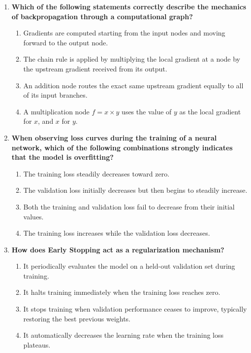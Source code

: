 \documentclass[11pt]{article}
\begin{document}
\begin{enumerate}
    \item \textbf{Which of the following statements correctly describe the mechanics of backpropagation through a computational graph?}
    \begin{enumerate}
        \item[A)] Gradients are computed starting from the input nodes and moving forward to the output node.
        \item[B)] The chain rule is applied by multiplying the local gradient at a node by the upstream gradient received from its output.
        \item[C)] An addition node routes the exact same upstream gradient equally to all of its input branches.
        \item[D)] A multiplication node $f = x \times y$ uses the value of $y$ as the local gradient for $x$, and $x$ for $y$.
    \end{enumerate}
    \vspace{0.5cm}

    \item \textbf{When observing loss curves during the training of a neural network, which of the following combinations strongly indicates that the model is overfitting?}
    \begin{enumerate}
        \item[A)] The training loss steadily decreases toward zero.
        \item[B)] The validation loss initially decreases but then begins to steadily increase.
        \item[C)] Both the training and validation loss fail to decrease from their initial values.
        \item[D)] The training loss increases while the validation loss decreases.
    \end{enumerate}
    \vspace{0.5cm}

    \item \textbf{How does Early Stopping act as a regularization mechanism?}
    \begin{enumerate}
        \item[A)] It periodically evaluates the model on a held-out validation set during training.
        \item[B)] It halts training immediately when the training loss reaches zero.
        \item[C)] It stops training when validation performance ceases to improve, typically restoring the best previous weights.
        \item[D)] It automatically decreases the learning rate when the training loss plateaus.
    \end{enumerate}
\end{enumerate}
\end{document}

